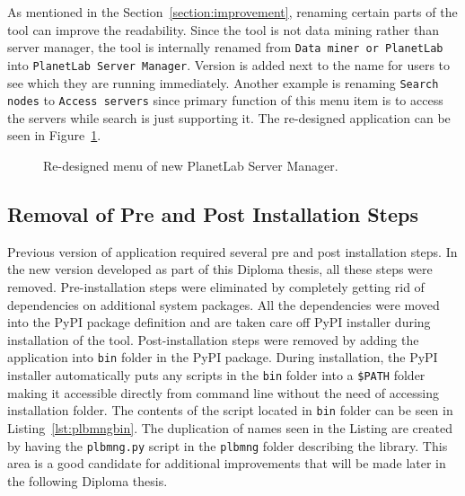 {{{{As mentioned in the Section~\ref{section:improvement}, renaming certain parts of the tool can improve the readability. Since the tool is not data mining rather than server manager, the tool is internally renamed from \texttt{Data miner or PlanetLab} into \texttt{PlanetLab Server Manager}. Version is added next to the name for users to see which they are running immediately. Another example is renaming \texttt{Search nodes} to \texttt{Access servers} since primary function of this menu item is to access the servers while search is just supporting it. The re-designed application can be seen in Figure~\ref{fig:redesigned}.\\

\begin{figure}[H]
	\centering
	\caption{Re-designed menu of new PlanetLab Server Manager.}
	\label{fig:redesigned}
\end{figure}

\subsection{Removal of Pre and Post Installation Steps}
Previous version of application required several pre and post installation steps. In the new version developed as part of this Diploma thesis, all these steps were removed. Pre-installation steps were eliminated by completely getting rid of dependencies on additional system packages. All the dependencies were moved into the PyPI package definition and are taken care off PyPI installer during installation of the tool. Post-installation steps were removed by adding the application into \texttt{bin} folder in the PyPI package. During installation, the PyPI installer automatically puts any scripts in the \texttt{bin} folder into a \texttt{\$PATH} folder making it accessible directly from command line without the need of accessing installation folder. The contents of the script located in \texttt{bin} folder can be seen in Listing~\ref{lst:plbmngbin}. The duplication of names seen in the Listing are created by having the \texttt{plbmng.py} script in the \texttt{plbmng} folder describing the library. This area is a good candidate for additional improvements that will be made later in the following Diploma thesis.

}}}}
